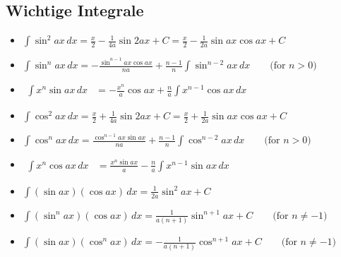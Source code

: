\documentclass[25pt]{sciposter}
\begin{document}
\begin{multicols}{3}
		\newpage
		
		\subsection*{Wichtige Integrale}
		
		\begin{itemize}	
			
			\item ${\displaystyle \int \sin ^{2}{ax}\,dx={\frac {x}{2}}-{\frac {1}{4a}}\sin 2ax+C={\frac {x}{2}}-{\frac {1}{2a}}\sin ax\cos ax+C}$
			
			\item ${\displaystyle \int \sin ^{n}{ax}\,dx=-{\frac {\sin ^{n-1}ax\cos ax}{na}}+{\frac {n-1}{n}}\int \sin ^{n-2}ax\,dx\qquad {\mbox{(for }}n>0{\mbox{)}}}$
			
			\item ${\displaystyle {\begin{aligned}\int x^{n}\sin ax\,dx&=-{\frac {x^{n}}{a}}\cos ax+{\frac {n}{a}}\int x^{n-1}\cos ax\,dx\end{aligned}}}$
			
			\item ${\displaystyle \int \cos ^{2}{ax}\,dx={\frac {x}{2}}+{\frac {1}{4a}}\sin 2ax+C={\frac {x}{2}}+{\frac {1}{2a}}\sin ax\cos ax+C}$
			
			\item ${\displaystyle \int \cos ^{n}ax\,dx={\frac {\cos ^{n-1}ax\sin ax}{na}}+{\frac {n-1}{n}}\int \cos ^{n-2}ax\,dx\qquad {\mbox{(for }}n>0{\mbox{)}}}$
			
			\item ${\displaystyle {\begin{aligned}\int x^{n}\cos ax\,dx&={\frac {x^{n}\sin ax}{a}}-{\frac {n}{a}}\int x^{n-1}\sin ax\,dx\end{aligned}}}$
			
			
			
			
			
			\item ${\displaystyle \int (\sin ax)(\cos ax)\,dx={\frac {1}{2a}}\sin ^{2}ax+C}$
			
			\item ${\displaystyle \int (\sin ^{n}ax)(\cos ax)\,dx={\frac {1}{a(n+1)}}\sin ^{n+1}ax+C\qquad {\mbox{(for }}n\neq -1{\mbox{)}}}$
			
			\item ${\displaystyle \int (\sin ax)(\cos ^{n}ax)\,dx=-{\frac {1}{a(n+1)}}\cos ^{n+1}ax+C\qquad {\mbox{(for }}n\neq -1{\mbox{)}}}$
			

\end{itemize}
\end{multicols}
\end{document}
